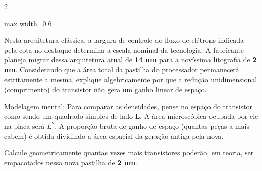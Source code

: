 \documentclass[twoside, 10pt, a4paper]{article}
\begin{document}
\begin{multicols*}{2}
\begin{center}
\begin{adjustbox}{max width=0.6\linewidth}
\end{adjustbox}
\end{center}

Nesta arquitetura clássica, a largura de controle do fluxo de elétrons indicada pela cota no destaque determina a escala nominal da tecnologia. A fabricante planeja migrar dessa arquitetura atual de \textbf{14 nm} para a novíssima litografia de \textbf{2 nm}. 
Considerando que a área total da pastilha do processador permanecerá estritamente a mesma, explique algebricamente por que a redução unidimensional (comprimento) do transistor não gera um ganho linear de espaço. 
\begin{boxdica}
    Modelagem mental: Para comparar as densidades, pense no espaço do transistor como sendo um quadrado simples de lado \textbf{L}. A área microscópica ocupada por ele na placa será $L^2$. A proporção bruta de ganho de espaço (quantas peças a mais cabem) é obtida dividindo a área espacial da geração antiga pela nova.
\end{boxdica}
Calcule geometricamente quantas vezes mais transistores poderão, em teoria, ser empacotados nessa nova pastilha de \textbf{2 nm}.
\par\vspace{0.5cm}

\end{multicols*}
\end{document}
